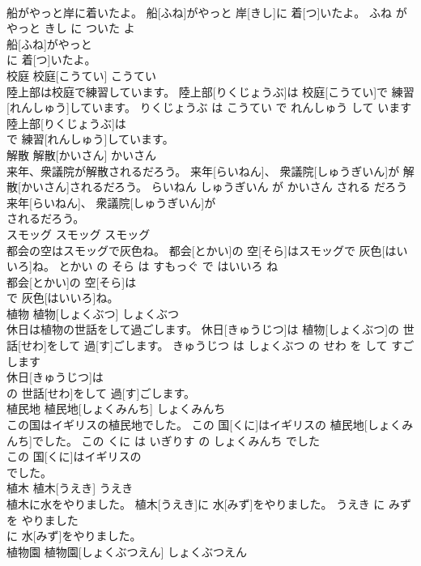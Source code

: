 \documentclass[8pt]{extreport}
\begin{document}
\begin{CJK}{UTF8}{min}
\\	船がやっと岸に着いたよ。	船[ふね]がやっと 岸[きし]に 着[つ]いたよ。	ふね が やっと きし に ついた よ	
\\	船[ふね]がやっと
\\	に 着[つ]いたよ。			
\\	校庭	校庭[こうてい]	こうてい	
\\	陸上部は校庭で練習しています。	陸上部[りくじょうぶ]は 校庭[こうてい]で 練習[れんしゅう]しています。	りくじょうぶ は こうてい で れんしゅう して います	
\\	陸上部[りくじょうぶ]は
\\	で 練習[れんしゅう]しています。			
\\	解散	解散[かいさん]	かいさん	
\\	来年、衆議院が解散されるだろう。	来年[らいねん]、 衆議院[しゅうぎいん]が 解散[かいさん]されるだろう。	らいねん しゅうぎいん が かいさん される だろう	
\\	来年[らいねん]、 衆議院[しゅうぎいん]が
\\	されるだろう。			
\\	スモッグ	スモッグ	スモッグ	
\\	都会の空はスモッグで灰色ね。	都会[とかい]の 空[そら]はスモッグで 灰色[はいいろ]ね。	とかい の そら は すもっぐ で はいいろ ね	
\\	都会[とかい]の 空[そら]は
\\	で 灰色[はいいろ]ね。			
\\	植物	植物[しょくぶつ]	しょくぶつ	
\\	休日は植物の世話をして過ごします。	休日[きゅうじつ]は 植物[しょくぶつ]の 世話[せわ]をして 過[す]ごします。	きゅうじつ は しょくぶつ の せわ を して すごします	
\\	休日[きゅうじつ]は
\\	の 世話[せわ]をして 過[す]ごします。			
\\	植民地	植民地[しょくみんち]	しょくみんち	
\\	この国はイギリスの植民地でした。	この 国[くに]はイギリスの 植民地[しょくみんち]でした。	この くに は いぎりす の しょくみんち でした	
\\	この 国[くに]はイギリスの
\\	でした。			
\\	植木	植木[うえき]	うえき	
\\	植木に水をやりました。	植木[うえき]に 水[みず]をやりました。	うえき に みず を やりました	
\\	に 水[みず]をやりました。			
\\	植物園	植物園[しょくぶつえん]	しょくぶつえん	

\end{CJK}
\end{document}
